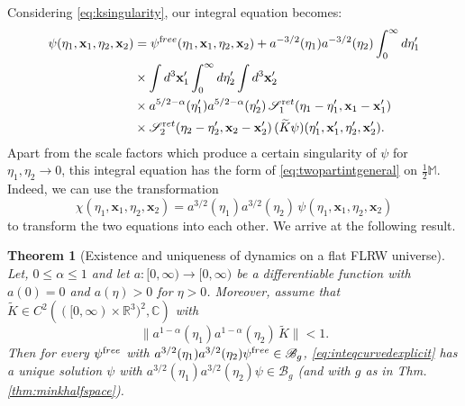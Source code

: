 \documentclass[b5paper,draft,openbib,12pt]{memoir}
\newtheorem{Thm}[Def]{Theorem}
\newcommand{\R}{\mathbb{R}}
\newcommand{\CC}{\mathbb{C}}
\newcommand{\M}{\mathbb{M}}
\newcommand{\vx}{\mathbf{x}}
\newcommand{\ret}{{\textup ret}}
\newcommand{\free}{{\textup free}}
\newcommand{\Banach}{\mathscr{B}}
\begin{document}
Considering \eqref{eq:ksingularity}, our integral equation becomes:
\begin{align}\nonumber
  \psi(\eta_1,\vx_1,\eta_2,\vx_2) &= \psi^\free(\eta_1,\vx_1,\eta_2,\vx_2) + a^{-3/2}(\eta_1) a^{-3/2}(\eta_2) \int_0^\infty d \eta_1' \\
  &\times \int d^3 \vx_1' \int_0^\infty d \eta_2' \int d^3 \vx_2'\nonumber\\\nonumber
  &\times a^{5/2-\alpha}(\eta_1') a^{5/2-\alpha}(\eta_2') \, \mathscr{S}_1^\ret(\eta_1-\eta_1', \vx_1-\vx_1')\\
  &\times  \mathscr{S}_2^\ret(\eta_2-\eta_2',\vx_2-\vx_2') \, (\widetilde{K} \psi)(\eta_1',\vx_1',\eta_2',\vx_2').
\label{eq:inteqcurvedexplicit}
\end{align}
Apart from the scale factors which produce a certain singularity of 
$\psi$ for $\eta_1,\eta_2 \rightarrow 0$, this integral equation has 
the form of \eqref{eq:twopartintgeneral} on $\frac{1}{2}\M$. Indeed, we can use 
the transformation
\begin{equation}
	\chi(\eta_1,\vx_1,\eta_2,\vx_2) = a^{3/2}(\eta_1) a^{3/2}(\eta_2)\, \psi(\eta_1,\vx_1,\eta_2,\vx_2)
	\label{eq:psichi}
\end{equation}
to transform the two equations into each other. We arrive at the 
following result.

\begin{Thm}[Existence and uniqueness of dynamics on a flat 
  FLRW universe] \label{thm:flrw}
	Let, $0 \leq \alpha \leq 1$ and let $a : [0,\infty) \rightarrow [0,\infty)$ be a differentiable function with $a(0)=0$ and $a(\eta) >0$ for $\eta>0$. Moreover, assume that $\widetilde{K} \in C^2 \left( ([0,\infty)\times \R^3)^2,\CC\right)$ with
  \begin{equation}
		\| a^{1-\alpha}(\eta_1) a^{1-\alpha}(\eta_2) \, \widetilde{K} \| <1.
	\label{eq:ktildecondition}
	\end{equation}
 Then for every $\psi^\free$ with 
 $a^{3/2}(\eta_1) a^{3/2}(\eta_2) \psi^\free \in \Banach_g$, 
 \eqref{eq:inteqcurvedexplicit} has a unique solution $\psi$ with 
 $a^{3/2}(\eta_1) a^{3/2}(\eta_2)\psi \in \Banach_g$ (and with \(g\) 
 as in Thm. \ref{thm:minkhalfspace}).
\end{Thm}
\end{document}
